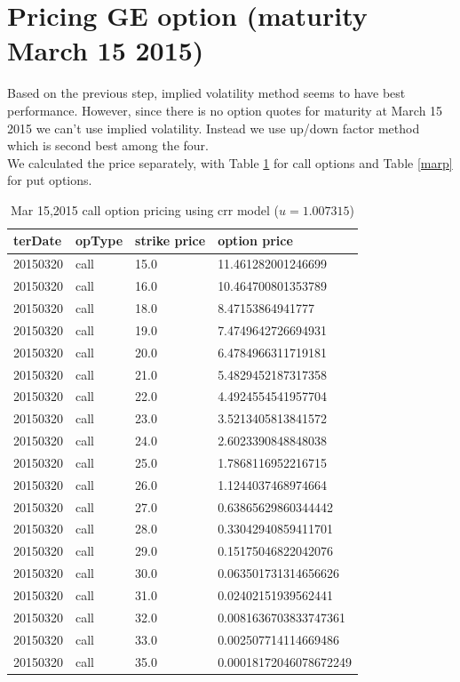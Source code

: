 \section{Pricing GE option (maturity March 15 2015)}
Based on the previous step, implied volatility method seems to have best performance.
However, since there is no option quotes for maturity at March 15 2015 we can't use implied volatility. Instead we use up/down factor method which is second best among the four.\\
We calculated the price separately, with Table \ref{marc} for call options and Table \ref{marp} for put options.\\
\begin{table}[H]
\centering
\caption{Mar 15,2015 call option pricing using crr model ($u=1.007315$)}
\label{marc}
\begin{tabular}{l|l|l|l}
\hline
\textbf{terDate}&\textbf{opType}&\textbf{strike price}&\textbf{option price}\\
\hline
20150320&call&15.0&11.461282001246699\\
20150320&call&16.0&10.464700801353789\\
20150320&call&18.0&8.47153864941777\\
20150320&call&19.0&7.4749642726694931\\
20150320&call&20.0&6.4784966311719181\\
20150320&call&21.0&5.4829452187317358\\
20150320&call&22.0&4.4924554541957704\\
20150320&call&23.0&3.5213405813841572\\
20150320&call&24.0&2.6023390848848038\\
20150320&call&25.0&1.7868116952216715\\
20150320&call&26.0&1.1244037468974664\\
20150320&call&27.0&0.63865629860344442\\
20150320&call&28.0&0.33042940859411701\\
20150320&call&29.0&0.15175046822042076\\
20150320&call&30.0&0.063501731314656626\\
20150320&call&31.0&0.02402151939562441\\
20150320&call&32.0&0.0081636703833747361\\
20150320&call&33.0&0.002507714114669486\\
20150320&call&35.0&0.00018172046078672249\\
\hline
\end{tabular}
\end{table}\noindent

